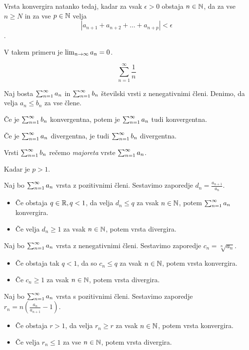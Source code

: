 Vrsta konvergira natanko tedaj, kadar za vsak $\epsilon>0$ obstaja $n \in \mathbb{N}$, da za vse $n \ge N$ in za vse $p \in \mathbb{N}$ velja \[|a_{n+1} + a_{n+2} + \ldots + a_{n+p}| < \epsilon\].

V takem primeru je $\lim_{n\to \infty} a_n = 0$.


\[
	\sum_{n=1}^{\infty} \frac{1}{n}
\]


Naj bosta $\sum_{n=1}^{\infty} a_n$ in $\sum_{n=1}^{\infty} {b_n}$ številski vrsti z nenegativnimi členi. Denimo, da velja $a_n \le b_n$ za vse člene. 

Če je $\sum_{n=1}^{\infty} {b_n}$ konvergentna, potem je $\sum_{n=1}^{\infty} a_n$ tudi konvergentna. 

Če je $\sum_{n=1}^{\infty} a_n$ divergentna, je tudi $\sum_{n=1}^{\infty} {b_n}$ divergentna. 

Vrsti $\sum_{n=1}^{\infty} {b_n}$ rečemo \textit{majoreta} vrste $\sum_{n=1}^{\infty} a_n$.


Kadar je $p > 1$.


Naj bo $\sum_{n=1}^{\infty} a_n$ vrsta z pozitivnimi členi. Sestavimo zaporedje $d_n = \frac{a_{n+1}}{a_n}$.

\begin{itemize}
	\item Če obstaja $q \in \mathbb{R}, q < 1$, da velja $d_n \le q$ za vsak $n \in \mathbb{N}$, potem $\sum_{n=1}^{\infty} a_n$ konvergira.
	\item Če velja $d_n \ge 1$ za vsak $n\in \mathbb{N}$, potem vrsta divergira.
\end{itemize}


Naj bo $\sum_{n=1}^{\infty} a_n$ vrsta z nenegativnimi členi. Sestavimo zaporedje $c_n = \sqrt[n]{a_n}$.
\begin{itemize}
	\item Če obstaja tak $q < 1$, da so $c_n \le q$ za vsak $n \in \mathbb{N}$, potem vrsta konvergira.
	\item Če $c_n \ge 1$ za vsak $n \in \mathbb{N}$, potem vrsta divergira.
\end{itemize}


Naj bo $\sum_{n=1}^{\infty} a_n$ vrsta s pozitivnimi členi. Sestavimo zaporedje $r_n = n(\frac{a_n}{a_{n+1}} -1)$.
\begin{itemize}
	\item Če obstaja $r > 1$, da velja $r_n \ge r$ za vsak $n \in \mathbb{N}$, potem vrsta konvergira.
	\item Če velja $r_n \le 1$ za vse $n \in \mathbb{N}$, potem vrsta divergira.
\end{itemize}


